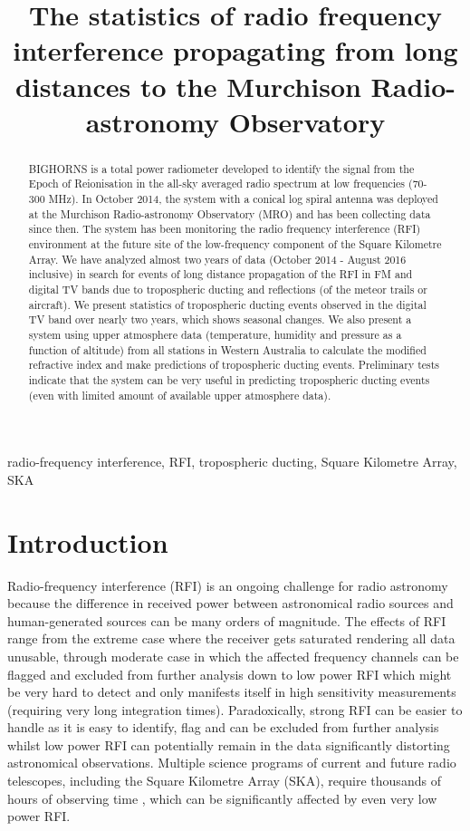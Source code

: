 \documentclass{article}
\title{The statistics of radio frequency interference propagating from long distances to the Murchison Radio-astronomy Observatory}
\begin{document}
%
\maketitle
%
\begin{abstract}
BIGHORNS is a total power radiometer developed to identify the signal from the Epoch of Reionisation in the all-sky averaged radio spectrum at low frequencies (70-300 MHz). 
In October 2014, the system with a conical log spiral antenna was deployed at the Murchison Radio-astronomy Observatory (MRO) and has been collecting data since then. 
The system has been monitoring the radio frequency interference (RFI) environment at the future site of the low-frequency component of the Square Kilometre Array. 
We have analyzed almost two years of data (October 2014 - August 2016 inclusive) in search for events of long distance propagation of the RFI in FM and digital TV bands due to tropospheric ducting and reflections (of the meteor trails or aircraft). 
We present statistics of tropospheric ducting events observed in the digital TV band over nearly two years, which shows seasonal changes. 
We also present a system using upper atmosphere data (temperature, humidity and pressure as a function of altitude) from all stations in Western Australia to calculate the modified refractive index and make predictions of tropospheric ducting events. 
Preliminary tests indicate that the system can be very useful in predicting tropospheric ducting events (even with limited amount of available upper atmosphere data).
\end{abstract}
%
\begin{keywords}
radio-frequency interference, RFI, tropospheric ducting, Square Kilometre Array, SKA
\end{keywords}
%
\section{Introduction}
\label{sec:intro}

Radio-frequency interference (RFI) is an ongoing challenge for radio astronomy because the difference in received power between astronomical radio sources and human-generated sources can be many orders of magnitude.
The effects of RFI range from the extreme case where the receiver gets saturated rendering all data unusable, through moderate case in which the affected frequency channels can be flagged and excluded from further analysis down to low power RFI which might be very hard to detect and only manifests itself in high sensitivity measurements (requiring very long integration times).
Paradoxically, strong RFI can be easier to handle as it is easy to identify, flag and can be excluded from further analysis whilst low power RFI can potentially remain in the data significantly distorting astronomical observations.
Multiple science programs of current and future radio telescopes, including the Square Kilometre Array (SKA), require thousands of hours of observing time \citep[e.g][]{2013PASA...30...31B,2015aska.confE...1K}, which can be significantly affected by even very low power RFI.
\end{document}
